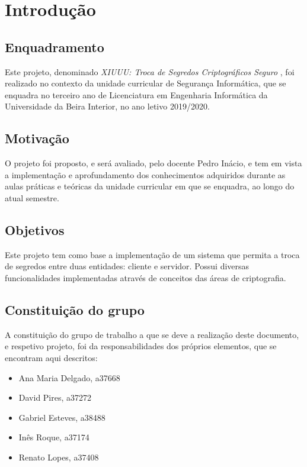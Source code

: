 \chapter{Introdução}
\label{chap:intro}

\section{Enquadramento}
\label{sec:amb} 
Este projeto, denominado \textit{XIUUU: Troca de Segredos Criptográficos Seguro
}, foi realizado no contexto da unidade curricular de Segurança Informática, que se enquadra no terceiro ano de Licenciatura em Engenharia Informática da Universidade da Beira Interior, no ano letivo 2019/2020.


\section{Motivação}
\label{sec:mot}
O  projeto  foi  proposto,  e  será  avaliado,  pelo docente  Pedro  Inácio, e tem em vista a implementação e aprofundamento dos conhecimentos adquiridos durante as aulas práticas e teóricas da unidade curricular em que se enquadra, ao longo do atual semestre.

\section{Objetivos}
\label{sec:obj}
Este projeto tem como base a implementação de um sistema que permita a troca de segredos entre duas entidades: cliente e servidor. Possui diversas funcionalidades implementadas através de conceitos das áreas de criptografia.

\section{Constituição do grupo}
\label{sec:const} 
A constituição do grupo de trabalho a que se deve a realização deste documento, e respetivo projeto, foi da responsabilidades dos próprios elementos, que se encontram aqui descritos:
\begin{itemize}
    \item Ana Maria Delgado, a37668
    \item David Pires, a37272   
    \item Gabriel Esteves, a38488
    \item Inês Roque, a37174 
    \item Renato Lopes, a37408
\end{itemize}

